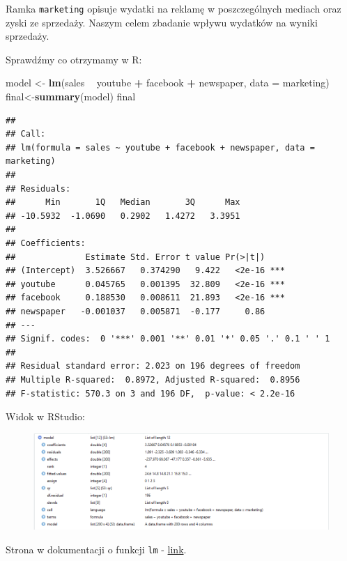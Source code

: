 \documentclass[]{article}
\newenvironment{Shaded}{\begin{snugshade}}{\end{snugshade}}
\newcommand{\KeywordTok}[1]{\textcolor[rgb]{0.13,0.29,0.53}{\textbf{#1}}}
\newcommand{\DataTypeTok}[1]{\textcolor[rgb]{0.13,0.29,0.53}{#1}}
\newcommand{\StringTok}[1]{\textcolor[rgb]{0.31,0.60,0.02}{#1}}
\newcommand{\OperatorTok}[1]{\textcolor[rgb]{0.81,0.36,0.00}{\textbf{#1}}}
\newcommand{\NormalTok}[1]{#1}
\begin{document}
Ramka \texttt{marketing} opisuje wydatki na reklamę w poszczególnych
mediach oraz zyski ze sprzedaży. Naszym celem zbadanie wpływu wydatków
na wyniki sprzedaży.

Sprawdźmy co otrzymamy w R:

\begin{Shaded}
\begin{Highlighting}[]
\NormalTok{model <-}\StringTok{ }\KeywordTok{lm}\NormalTok{(sales }\OperatorTok{~}\StringTok{ }\NormalTok{youtube }\OperatorTok{+}\StringTok{ }\NormalTok{facebook }\OperatorTok{+}\StringTok{ }\NormalTok{newspaper, }\DataTypeTok{data =}\NormalTok{ marketing)}
\NormalTok{final<-}\KeywordTok{summary}\NormalTok{(model)}
\NormalTok{final}
\end{Highlighting}
\end{Shaded}

\begin{verbatim}
## 
## Call:
## lm(formula = sales ~ youtube + facebook + newspaper, data = marketing)
## 
## Residuals:
##      Min       1Q   Median       3Q      Max 
## -10.5932  -1.0690   0.2902   1.4272   3.3951 
## 
## Coefficients:
##              Estimate Std. Error t value Pr(>|t|)    
## (Intercept)  3.526667   0.374290   9.422   <2e-16 ***
## youtube      0.045765   0.001395  32.809   <2e-16 ***
## facebook     0.188530   0.008611  21.893   <2e-16 ***
## newspaper   -0.001037   0.005871  -0.177     0.86    
## ---
## Signif. codes:  0 '***' 0.001 '**' 0.01 '*' 0.05 '.' 0.1 ' ' 1
## 
## Residual standard error: 2.023 on 196 degrees of freedom
## Multiple R-squared:  0.8972, Adjusted R-squared:  0.8956 
## F-statistic: 570.3 on 3 and 196 DF,  p-value: < 2.2e-16
\end{verbatim}

Widok w RStudio:

\begin{figure}
\centering
\includegraphics{lm.png}
\caption{}
\end{figure}

Strona w dokumentacji o funkcji \texttt{lm} -
\href{https://www.rdocumentation.org/packages/stats/versions/3.5.2/topics/lm}{link}.
\end{document}
